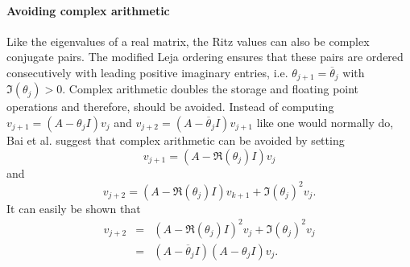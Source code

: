 \documentclass{scrartcl}
\begin{document}
\paragraph{Avoiding complex arithmetic}
Like the eigenvalues of a real matrix, the Ritz values can also be complex conjugate pairs. The modified Leja ordering ensures that these pairs are ordered consecutively with leading positive imaginary entries, i.e. $\theta_{j + 1} = \overline{\theta}_j$ with $\Im(\theta_j) > 0$. Complex arithmetic doubles the storage and floating point operations and therefore, should be avoided. Instead of computing $v_{j + 1} = (A - \theta_j I)v_j$ and $v_{j + 2} = (A - \overline{\theta}_j I)v_{j + 1}$ like one would normally do, Bai et al. \cite{doi:10.1093/imanum/14.4.563} suggest that complex arithmetic can be avoided by setting
\begin{equation}
v_{j + 1} = (A - \Re(\theta_j) I )v_j
\end{equation}
and
\begin{equation}
v_{j + 2} = (A - \Re(\theta_j) I )v_{k + 1} + \Im(\theta_j)^2 v_j.
\end{equation}
It can easily be shown that 
\begin{eqnarray*}
v_{j + 2} &=& (A - \Re(\theta_j) I )^2v_{j} + \Im(\theta_j)^2 v_j \\
&=& (A - \overline{\theta}_j I )(A - \theta_j I )v_{j}.
\end{eqnarray*}
\end{document}
